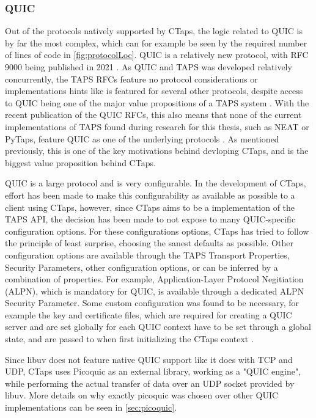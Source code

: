 \subsubsection{QUIC} \label{sec:quicImpl}
Out of the protocols natively supported by CTaps, the logic related to QUIC 
is by far the most complex, which can for example be seen by the required
number of lines of code in \cref{fig:protocolLoc}. QUIC is a relatively
new protocol, with RFC 9000 being published in 2021 \cite{iyengarQUICUDPBasedMultiplexed2021}. As QUIC and TAPS was developed relatively concurrently, the TAPS
RFCs feature no protocol considerations or implementations hints like is featured
for several other protocols, despite access to QUIC being one of the
major value propositions of a TAPS system \cite{brunstromImplementingInterfacesTransport2025}. 
With the recent publication of the QUIC RFCs, this also means that
none of the current implementations of TAPS found during research for this
thesis, such as NEAT or PyTaps, feature QUIC as one of the underlying protocols
\cite{khademiNEATPlatformProtocolIndependent2017}\cite{frankePythonasynciotaps2025}.
As mentioned previously, this is one of the key motivations behind devloping CTaps,
and is the biggest value proposition behind CTaps.

QUIC is a large protocol and is very configurable. In the development of CTaps,
effort has been made to make this configurability as available as possible to
a client using CTaps, however, since CTaps aims to be a implementation of the
TAPS API, the decision has been made to not expose to many QUIC-specific configuration 
options. 
For these configurations options, CTaps has tried to follow the principle of
least surprise, choosing the sanest defaults as possible. Other configuration
options are available through the TAPS Transport Properties, Security Parameters,
other configuration options, or can be inferred by a combination of properties.
For example, Application-Layer Protocol Negitiation (ALPN), which is mandatory for QUIC,
is available through a dedicated ALPN Security Parameter. Some custom configuration
was found to be necessary, for example the key and certificate files, which are required
for creating a QUIC server and are set globally for each QUIC context have to be
set through a global state, and are passed to when first initializing the CTaps
context .

Since libuv does not feature native QUIC support like it does with TCP and UDP,
CTaps uses Picoquic as an external library, working as a "QUIC engine",
while performing the actual transfer of data over an UDP socket provided by libuv.
More details on why exactly picoquic was chosen over other QUIC implementations
can be seen in \cref{sec:picoquic}.

